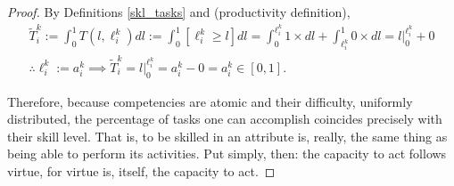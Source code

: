 \documentclass[hidelinks, nonatbib]{elsarticle}
\begin{document}
\begin{proof}
    By Definitions \ref{skl_tasks} and (productivity definition),
    \begin{gather}
        \tilde{T}_{i}^{k}
        :=
        \int_{0}^{1}
        T(l, \ell_{i}^{k})
        dl
        :=
        \int_{0}^{1}
        [
            \ell_{i}^{k}
            \geq
            l
        ]
        dl
        =
        \int_{0}^{\ell_{i}^{k}}
        1
        \times
        dl
        +
        \int_{\ell_{i}^{k}}^{1}
        0
        \times
        dl
        =
        l\big|_{0}^{\ell_{i}^{k}}
        + 0
        \\
        \therefore
        \ell_{i}^{k}
        :=
        a_{i}^{k}
        \implies
        \tilde{T}_{i}^{k}
        =
        l\big|_{0}^{\ell_{i}^{k}}
        =
        a_{i}^{k}
        - 0
        =
        a_{i}^{k}
        \in
        [0,1]
        .
    \end{gather}

    Therefore, because competencies are atomic and their difficulty, uniformly distributed, the percentage of tasks one can accomplish coincides precisely with their skill level. That is, to be skilled in an attribute is, really, the same thing as being able to perform its activities. Put simply, then: the capacity to act follows virtue, for virtue is, itself, the capacity to act.
\end{proof}

\end{document}
